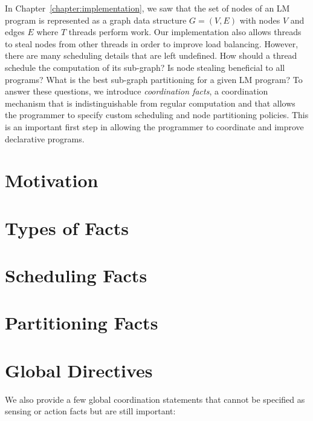 In Chapter~\ref{chapter:implementation}, we saw that the set of nodes of an LM
program is represented as a graph data structure $G = (V, E)$ with nodes $V$ and
edges $E$ where $T$ threads perform work. Our implementation also allows threads
to steal nodes from other threads in order to improve load balancing.  However,
there are many scheduling details that are left undefined. How should a thread
schedule the computation of its sub-graph? Is node stealing beneficial to all
programs? What is the best sub-graph partitioning for a given LM program?  To
answer these questions, we introduce \emph{coordination facts}, a coordination
mechanism that is indistinguishable from regular computation and that allows the
programmer to specify custom scheduling and node partitioning policies. This is
an important first step in allowing the programmer to coordinate and improve
declarative programs.

\section{Motivation}\label{section:coord:rationale}



\section{Types of Facts}



\section{Scheduling Facts}\label{sec:coord:fifo}



\section{Partitioning Facts}


\section{Global Directives}\label{sec:coordination:global}

We also provide a few global coordination statements that cannot be specified
as sensing or action facts but are still important:


